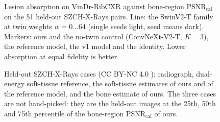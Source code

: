 \begin{table}[!t]
\centering
\caption{Held-out SZCH-X-Rays pairs: bone-region and whole-image metrics for ours and the comparators, calibrated (primary) and raw. HF
ratio: high-frequency energy of the non-bone region relative to the dual-energy soft-tissue image (1 = equal).}
\label{tab:szch_heldout}
\end{table}

\begin{table}[!t]
\centering
\caption{H2$'$ non-inferiority on the 51 held-out SZCH-X-Rays pairs (paired differences, image bootstrap, one-sided 95\,\% lower bound).}
\label{tab:h2}
\end{table}

\begin{figure}[!t]
\centering
{}
\caption{Lesion absorption on VinDr-RibCXR against bone-region PSNR$_{\mathrm{cal}}$ on the 51 held-out SZCH-X-Rays pairs. Line: the
SwinV2-T family at twin weights $w=0\ldots64$ (single seeds light, seed means dark). Markers: ours and the no-twin control
(ConvNeXt-V2-T, $K=3$), the reference model, the v1 model and the identity. Lower absorption at equal fidelity is better.}
\label{fig:pareto}
\end{figure}

\begin{figure}[!t]
\centering
{}
\caption{Held-out SZCH-X-Rays cases (CC BY-NC 4.0 \cite{sun2026bsldm}): radiograph, dual-energy soft-tissue reference, the soft-tissue
estimates of ours and of the reference model, and the bone estimate of ours. The three cases are not hand-picked: they are the held-out
images at the 25th, 50th and 75th percentile of the bone-region PSNR$_{\mathrm{cal}}$ of ours.}
\label{fig:qualitative}
\end{figure}

